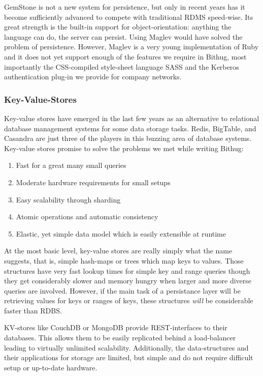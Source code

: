 \documentclass{llncs}
\begin{document}
GemStone is not a new system\cite{citation needed} for persistence, but only
in recent years has it become sufficiently advanced to compete with traditional
RDMS speed-wise. Its great strength is the built-in support for 
object-orientation: anything the language can do, the server can persist. Using
Maglev would have solved the problem of persistence. However, Maglev is a very 
young implementation of Ruby and it does not yet support enough of the features
we require in Bithug, most importantly the CSS-compiled style-sheet language 
SASS and the Kerberos authentication plug-in we provide for company networks.
\subsubsection{Key-Value-Stores}
Key-value stores have emerged in the last few years as an alternative to 
relational database management systems for some data storage tasks. 
Redis, BigTable, and Casandra are just three of the players in this buzzing
area of database systems. Key-value stores promise to solve the problems we 
met while writing Bithug:
\begin{enumerate}
  \item Fast for a great many small queries
  \item Moderate hardware requirements for small setups
  \item Easy scalability through sharding
  \item Atomic operations and automatic consistency
  \item Elastic, yet simple data model which is easily extensible at runtime
\end{enumerate}

At the most basic level, key-value stores are really simply what the name 
suggests, that is, simple hash-maps or trees which map keys to values. Those 
structures have very fast lookup times for simple key and range queries though 
they get considerably slower and memory hungry when larger and more diverse 
queries are involved. However, if the main task of a persistance layer will be
retrieving values for keys or ranges of keys, these structures \emph{will} 
be\cite{citation needed} considerable faster than RDBS.

KV-stores like CouchDB or MongoDB provide REST-interfaces to their 
databases. This allows them to be easily replicated behind a load-balancer 
leading to virtually unlimited scalability. Additionally, the data-structures 
and their applications for storage are limited, but simple 
and do not require difficult setup or up-to-date hardware. 
\end{document}
